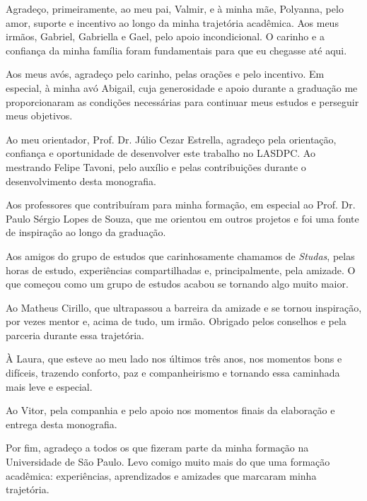Agradeço, primeiramente, ao meu pai, Valmir, e à minha mãe, Polyanna, pelo amor, suporte e incentivo ao longo da minha trajetória acadêmica. Aos meus irmãos, Gabriel, Gabriella e Gael, pelo apoio incondicional. O carinho e a confiança da minha família foram fundamentais para que eu chegasse até aqui.

Aos meus avós, agradeço pelo carinho, pelas orações e pelo incentivo. Em especial, à minha avó Abigail, cuja generosidade e apoio durante a graduação me proporcionaram as condições necessárias para continuar meus estudos e perseguir meus objetivos.

Ao meu orientador, Prof. Dr. Júlio Cezar Estrella, agradeço pela orientação, confiança e oportunidade de desenvolver este trabalho no LASDPC. Ao mestrando Felipe Tavoni, pelo auxílio e pelas contribuições durante o desenvolvimento desta monografia.

Aos professores que contribuíram para minha formação, em especial ao Prof. Dr. Paulo Sérgio Lopes de Souza, que me orientou em outros projetos e foi uma fonte de inspiração ao longo da graduação.

Aos amigos do grupo de estudos que carinhosamente chamamos de \textit{Studas}, pelas horas de estudo, experiências compartilhadas e, principalmente, pela amizade. O que começou como um grupo de estudos acabou se tornando algo muito maior.

Ao Matheus Cirillo, que ultrapassou a barreira da amizade e se tornou inspiração, por vezes mentor e, acima de tudo, um irmão. Obrigado pelos conselhos e pela parceria durante essa trajetória.

À Laura, que esteve ao meu lado nos últimos três anos, nos momentos bons e difíceis, trazendo conforto, paz e companheirismo e tornando essa caminhada mais leve e especial.

Ao Vitor, pela companhia e pelo apoio nos momentos finais da elaboração e entrega desta monografia.

Por fim, agradeço a todos os que fizeram parte da minha formação na Universidade de São Paulo. Levo comigo muito mais do que uma formação acadêmica: experiências, aprendizados e amizades que marcaram minha trajetória.